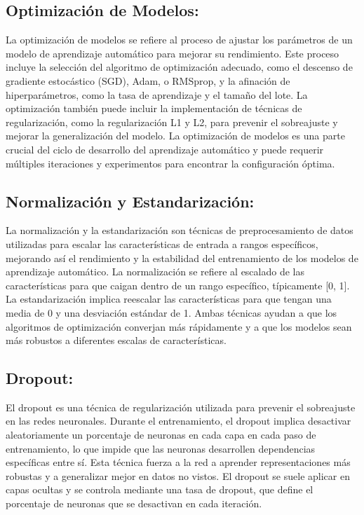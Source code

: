 \subsection{Optimización de Modelos: }
La optimización de modelos se refiere al proceso de ajustar los parámetros de un modelo de aprendizaje automático para mejorar su rendimiento. Este proceso incluye la selección del algoritmo de optimización adecuado, como el descenso de gradiente estocástico (SGD), Adam, o RMSprop, y la afinación de hiperparámetros, como la tasa de aprendizaje y el tamaño del lote. La optimización también puede incluir la implementación de técnicas de regularización, como la regularización L1 y L2, para prevenir el sobreajuste y mejorar la generalización del modelo. La optimización de modelos es una parte crucial del ciclo de desarrollo del aprendizaje automático y puede requerir múltiples iteraciones y experimentos para encontrar la configuración óptima.
\subsection{Normalización y Estandarización: }
La normalización y la estandarización son técnicas de preprocesamiento de datos utilizadas para escalar las características de entrada a rangos específicos, mejorando así el rendimiento y la estabilidad del entrenamiento de los modelos de aprendizaje automático. La normalización se refiere al escalado de las características para que caigan dentro de un rango específico, típicamente [0, 1]. La estandarización implica reescalar las características para que tengan una media de 0 y una desviación estándar de 1. Ambas técnicas ayudan a que los algoritmos de optimización converjan más rápidamente y a que los modelos sean más robustos a diferentes escalas de características.
\subsection{Dropout: }
El dropout es una técnica de regularización utilizada para prevenir el sobreajuste en las redes neuronales. Durante el entrenamiento, el dropout implica desactivar aleatoriamente un porcentaje de neuronas en cada capa en cada paso de entrenamiento, lo que impide que las neuronas desarrollen dependencias específicas entre sí. Esta técnica fuerza a la red a aprender representaciones más robustas y a generalizar mejor en datos no vistos. El dropout se suele aplicar en capas ocultas y se controla mediante una tasa de dropout, que define el porcentaje de neuronas que se desactivan en cada iteración.

